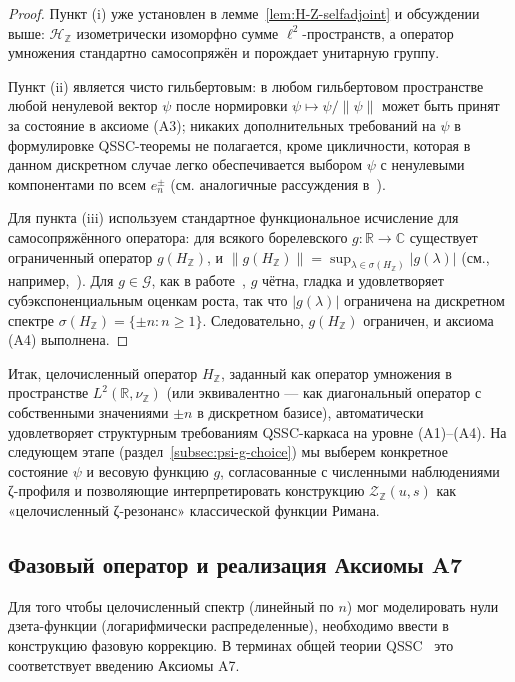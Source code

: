 \documentclass{article}
\numberwithin{equation}{section}
\theoremstyle{plain}
\theoremstyle{definition}
\theoremstyle{remark}
\begin{document}
\begin{proof}
Пункт (i) уже установлен в лемме~\ref{lem:H-Z-selfadjoint} и обсуждении
выше: \(\mathcal H_{\mathbb Z}\) изометрически изоморфно сумме
\(\ell^2\)-пространств, а оператор умножения стандартно самосопряжён
и порождает унитарную группу.

Пункт (ii) является чисто гильбертовым: в любом гильбертовом пространстве
любой ненулевой вектор \(\psi\) после нормировки \(\psi\mapsto\psi/\|\psi\|\)
может быть принят за состояние в аксиоме \textup{(A3)}; никаких
дополнительных требований на \(\psi\) в формулировке QSSC-теоремы не
полагается, кроме цикличности, которая в данном дискретном случае
легко обеспечивается выбором \(\psi\) с ненулевыми компонентами по всем
\(e_n^\pm\) (см. аналогичные рассуждения в~\cite{ReedSimonI}).

Для пункта (iii) используем стандартное функциональное исчисление для
самосопряжённого оператора: для всякого борелевского \(g:\mathbb R\to\mathbb C\)
существует ограниченный оператор \(g(H_{\mathbb Z})\), и
\(\|g(H_{\mathbb Z})\|=\sup_{\lambda\in\sigma(H_{\mathbb Z})}|g(\lambda)|\)
(см., например,~\cite{RudinFA,DunfordSchwartzII}). Для \(g\in\mathcal G\),
как в работе~\cite{Monakhov-QSG-002}, \(g\) чётна, гладка и удовлетворяет
субэкспоненциальным оценкам роста, так что \(|g(\lambda)|\) ограничена
на дискретном спектре \(\sigma(H_{\mathbb Z})=\{\pm n:n\ge 1\}\). Следовательно,
\(g(H_{\mathbb Z})\) ограничен, и аксиома \textup{(A4)} выполнена.
\end{proof}

\noindent
Итак, целочисленный оператор \(H_{\mathbb Z}\), заданный как оператор умножения
в пространстве \(L^2(\mathbb R,\nu_{\mathbb Z})\) (или эквивалентно —
как диагональный оператор с собственными значениями \(\pm n\) в дискретном
базисе), автоматически удовлетворяет структурным требованиям QSSC-каркаса
на уровне \textup{(A1)}–\textup{(A4)}. На следующем этапе (раздел~\ref{subsec:psi-g-choice})
мы выберем конкретное состояние \(\psi\) и весовую функцию \(g\), согласованные
с численными наблюдениями ζ-профиля и позволяющие интерпретировать
конструкцию \(\mathcal Z_{\mathbb Z}(u,s)\) как «целочисленный ζ-резонанс»
классической функции Римана.

\subsection{Фазовый оператор и реализация Аксиомы A7}
\label{subsec:phase-operator}

Для того чтобы целочисленный спектр (линейный по $n$) мог моделировать нули дзета-функции (логарифмически распределенные), необходимо ввести в конструкцию фазовую коррекцию. В терминах общей теории QSSC~\cite{Monakhov-QSG-002} это соответствует введению Аксиомы A7.
\end{document}
